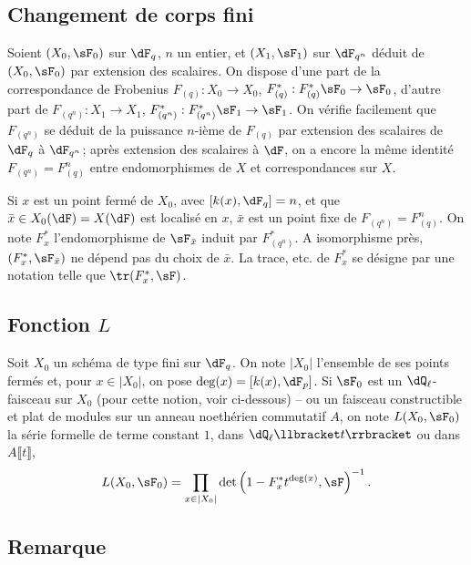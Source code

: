 \subsection{Changement de corps fini}\label{II:1-5}

Soient $(X_0,\sF_0)$ sur $\dF_q$, $n$ un entier, et $(X_1,\sF_1)$ sur 
$\dF_{q^n}$ déduit de $(X_0,\sF_0)$ par extension des scalaires. On dispose 
d'une part de la correspondance de Frobenius $F_{(q)}:X_0\to X_0$, 
$F_{(q)}^*:F_{(q)}^*\sF_0\to \sF_0$, d'autre part de 
$F_{(q^n)}:X_1\to X_1$, $F_{(q^n)}^*:F_{(q^n)}^*\sF_1\to\sF_1$. On vérifie 
facilement que $F_{(q^n)}$ se déduit de la puissance $n$-ième de $F_{(q)}$ 
par extension des scalaires de $\dF_q$ à $\dF_{q^n}$; après extension des 
scalaires à $\dF$, on a encore la même identité $F_{(q^n)}=F_{(q)}^n$ 
entre endomorphismes de $X$ et correspondances sur $X$. 

Si $x$ est un point fermé de $X_0$, avec $[k(x),\dF_q]=n$, et que 
$\bar x\in X_0(\dF) = X(\dF)$ est localisé en $x$, $\bar x$ est un point 
fixe de $F_{(q^n)}=F_{(q)}^n$. On note $F_x^*$ l'endomorphisme de 
$\sF_{\bar x}$ induit par $F_{(q^n)}^*$. A isomorphisme près, 
$(F_x^*,\sF_{\bar x})$ ne dépend pas du choix de $\bar x$. La trace, 
etc. de $F_x^*$ se désigne par une notation telle que 
$\tr(F_x^*,\sF)$. 





\subsection{Fonction \texorpdfstring{$L$}{L}}\label{II:1-6}

Soit $X_0$ un schéma de type fini sur $\dF_q$. On note $|X_0|$ l'ensemble de 
ses points fermés et, pour $x\in |X_0|$, on pose $\deg(x)=[k(x),\dF_p]$. Si 
$\sF_0$ est un $\dQ_\ell$-faisceau sur $X_0$ (pour cette notion, voir 
ci-dessous) -- ou un faisceau constructible et plat de modules sur un 
anneau noethérien commutatif $A$, on note $L(X_0,\sF_0)$ la série formelle 
de terme constant $1$, dans $\dQ_\ell\llbracket t\rrbracket$ ou dans 
$A\llbracket t\rrbracket$, 
\[
  L(X_0,\sF_0) = \prod_{x\in|X_0|} \det\left(1-F_x^* t^{\deg(x)},\sF\right)^{-1} \text{.}
\]





\subsection{Remarque}\label{II:1-7}

